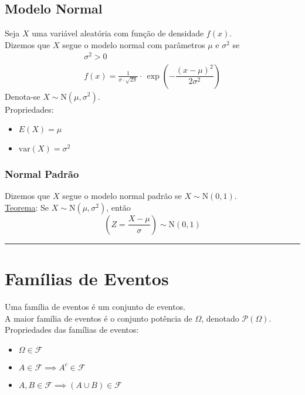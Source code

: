 \documentclass{article}
\begin{document}
\pagebreak


\subsection{Modelo Normal}
Seja $X$ uma variável aleatória com função de densidade $f(x)$. \\
Dizemos que $X$ segue o modelo normal com parâmetros $\mu$ e $\sigma^2$ se
\begin{gather*}
  \sigma^2 > 0 \\[5pt]
  f(x) = \frac{1}{\sigma \cdot \sqrt{2\pi}} \cdot\, \exp \left( -\dfrac{{(x - \mu)}^2}{2 \sigma^2} \right)
\end{gather*}
Denota-se $X \sim \text{N}\left(\mu, \sigma^2\right)$. \\[10pt]
Propriedades:
\begin{itemize}
  \item $E(X) = \mu$
  \item $\text{var}(X) = \sigma^2$
\end{itemize}

\subsubsection{Normal Padrão}
Dizemos que $X$ segue o modelo normal padrão se $X \sim \text{N}\left(0, 1\right)$. \\[10pt]
\uline{Teorema}: Se $X \sim \text{N}\left(\mu, \sigma^2\right)$, então
\[ \left( Z = \frac{X - \mu}{\sigma} \right) \sim \text{N}\left(0, 1\right) \]

\vspace{10pt}\hrule

\section{Famílias de Eventos}
Uma família de eventos é um conjunto de eventos. \\
A maior família de eventos é o conjunto potência de $\Omega$, denotado $\mathcal{P}(\Omega)$. \\[5pt]
Propriedades das famílias de eventos:
\begin{itemize}
  \item $\Omega \in \mathcal{F}$
  \item $A \in \mathcal{F} \implies A^c \in \mathcal{F}$
  \item $A, B \in \mathcal{F} \implies (A \cup B) \in \mathcal{F}$
\end{itemize}
\end{document}
